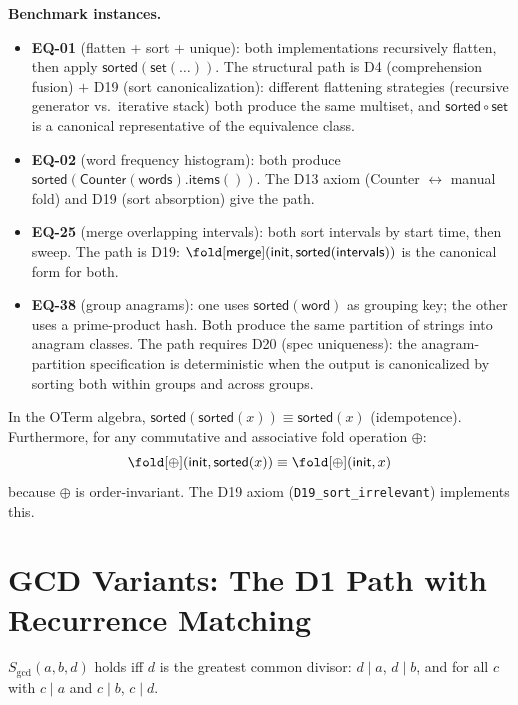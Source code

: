 \noindent\textbf{Benchmark instances.}
\begin{itemize}
  \item \textbf{EQ-01} (flatten + sort + unique): both
    implementations recursively flatten, then apply
    $\mathsf{sorted}(\mathsf{set}(\ldots))$.  The structural
    path is D4 (comprehension fusion) $+$ D19 (sort canonicalization):
    different flattening strategies (recursive generator vs.\
    iterative stack) both produce the same multiset, and
    $\mathsf{sorted} \circ \mathsf{set}$ is a canonical
    representative of the equivalence class.
  \item \textbf{EQ-02} (word frequency histogram): both produce
    $\mathsf{sorted}(\mathsf{Counter}(\mathsf{words}).
    \mathsf{items}())$.  The D13 axiom (Counter $\leftrightarrow$
    manual fold) and D19 (sort absorption) give the path.
  \item \textbf{EQ-25} (merge overlapping intervals): both sort
    intervals by start time, then sweep.  The path is D19:
    $\fold[\mathsf{merge}](\mathsf{init},
    \mathsf{sorted}(\mathsf{intervals}))$
    is the canonical form for both.
  \item \textbf{EQ-38} (group anagrams): one uses
    $\mathsf{sorted}(\mathsf{word})$ as grouping key; the other
    uses a prime-product hash.  Both produce the same partition
    of strings into anagram classes.  The path requires D20
    (spec uniqueness): the anagram-partition specification is
    deterministic when the output is canonicalized by sorting
    both within groups and across groups.
\end{itemize}

\begin{proposition}
\label{prop:sort-absorb}
In the OTerm algebra, $\mathsf{sorted}(\mathsf{sorted}(x)) \equiv
\mathsf{sorted}(x)$ (idempotence).  Furthermore, for any
commutative and associative fold operation $\oplus$:
\[
  \fold[\oplus](\mathsf{init}, \mathsf{sorted}(x)) \equiv
  \fold[\oplus](\mathsf{init}, x)
\]
because $\oplus$ is order-invariant.  The D19 axiom
(\texttt{D19\_sort\_irrelevant}) implements this.
\end{proposition}

\section{GCD Variants: The D1 Path with Recurrence Matching}
\label{sec:gcd-variants}

\begin{definition}
$S_{\gcd}(a, b, d)$ holds iff $d$ is the greatest common divisor:
$d \mid a$, $d \mid b$, and for all $c$ with $c \mid a$ and
$c \mid b$, $c \mid d$.
\end{definition}

